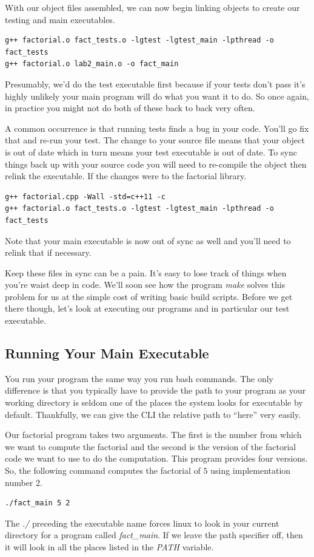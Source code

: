 \documentclass[]{tufte-handout}
\begin{document}
With our object files assembled, we can now begin linking objects to create our testing and main executables.
\begin{verbatim}
g++ factorial.o fact_tests.o -lgtest -lgtest_main -lpthread -o fact_tests
g++ factorial.o lab2_main.o -o fact_main
\end{verbatim}
Presumably, we'd do the test executable first because if your tests don't pass it's highly unlikely your main program will do what you want it to do. So once again, in practice you might not do both of these back to back very often. 

A common occurrence is that running tests finds a bug in your code. You'll go fix that and re-run your test. The change to your source file means that your object is out of date which in turn means your test executable is out of date.  To sync things back up with your source code you will need to re-compile the object then relink the executable. If the changes were to the factorial library. 
\begin{verbatim}
g++ factorial.cpp -Wall -std=c++11 -c
g++ factorial.o fact_tests.o -lgtest -lgtest_main -lpthread -o fact_tests
\end{verbatim}
Note that your main executable is now out of sync as well and you'll need to relink that if necessary.

Keep these files in sync can be a pain. It's easy to lose track of things when you're waist deep in code.  We'll soon see how the program \textit{make} solves this problem for us at the simple cost of writing basic build scripts. Before we get there though, let's look at executing our programs and in particular our test executable.

\subsection{Running Your Main Executable}

You run your program the same way you run bash commands. The only difference is that you typically have to provide the path to your program as your working directory is seldom one of the places the system looks for executable by default.  Thankfully, we can give the CLI the relative path to ``here'' very easily.  

Our factorial program takes two arguments. The first is the number from which we want to compute the factorial and the second is the version of the factorial code we want to use to do the computation. This program provides four versions. So, the following command computes the factorial of $5$ using implementation number 2.
\begin{verbatim}
./fact_main 5 2
\end{verbatim}
The \textit{./} preceding the executable name forces linux to look in your current directory for a program called \textit{fact\_main}. If we leave the path specifier off, then it will look in all the places listed in the \textit{PATH} variable. 
\end{document}

